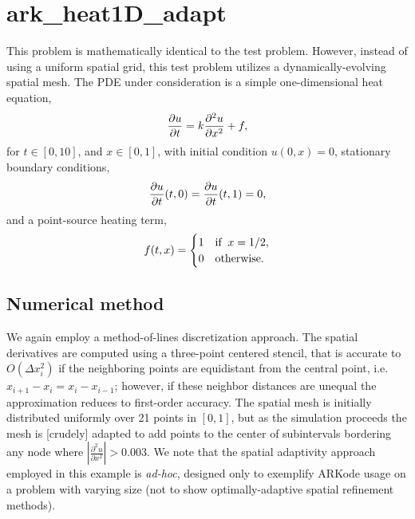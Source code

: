 \documentclass[letterpaper,10pt,english]{sphinxmanual}
\begin{document}
\section{ark\_heat1D\_adapt}
\label{c_serial:id26}\label{c_serial:ark-heat1d-adapt}
This problem is mathematically identical to the {\hyperref[c_serial:ark-heat1d]{\emph{}}} test
problem.  However, instead of using a uniform spatial grid, this test
problem utilizes a dynamically-evolving spatial mesh.  The PDE under
consideration is a simple one-dimensional heat equation,
\begin{gather}
\begin{split}\frac{\partial u}{\partial t} = k \frac{\partial^2 u}{\partial x^2} + f,\end{split}\notag
\end{gather}
for \(t \in [0, 10]\), and \(x \in [0, 1]\), with initial
condition \(u(0,x) = 0\), stationary boundary conditions,
\begin{gather}
\begin{split}\frac{\partial u}{\partial t}(t,0) = \frac{\partial u}{\partial t}(t,1) = 0,\end{split}\notag
\end{gather}
and a point-source heating term,
\begin{gather}
\begin{split}f(t,x) = \begin{cases} 1 & \text{if}\;\; x=1/2, \\
                       0 & \text{otherwise}. \end{cases}\end{split}\notag
\end{gather}

\subsection{Numerical method}
\label{c_serial:id27}
We again employ a method-of-lines discretization approach.  The
spatial derivatives are computed using a three-point centered stencil,
that is accurate to \(O(\Delta x_i^2)\) if the neighboring points are
equidistant from the central point, i.e. \(x_{i+1} - x_i = x_i -
x_{i-1}\); however, if these neighbor distances are unequal the
approximation reduces to first-order accuracy.  The spatial mesh is
initially distributed uniformly over 21 points in \([0,1]\), but
as the simulation proceeds the mesh is {[}crudely{]} adapted to add points
to the center of subintervals bordering any node where
\(\left|\frac{\partial^2 u}{\partial x^2}\right| > 0.003\).
We note that the spatial adaptivity approach employed in this example
is \emph{ad-hoc}, designed only to exemplify ARKode usage on a problem with
varying size (not to show optimally-adaptive spatial refinement
methods).
\end{document}
